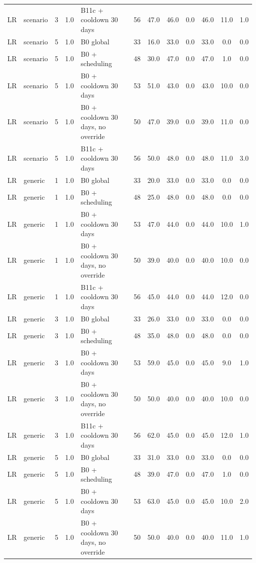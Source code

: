 \documentclass[10pt,onecolumn,letterpaper]{article}
\begin{document}
\begin{longtable}{lllllccccccc}
LR & scenario & 3 & 1.0 & B11c + cooldown 30 days & 56 & 47.0 & 46.0 & 0.0 & 46.0 & 11.0 & 1.0 \\
LR & scenario & 5 & 1.0 & B0 global & 33 & 16.0 & 33.0 & 0.0 & 33.0 & 0.0 & 0.0 \\
LR & scenario & 5 & 1.0 & B0 + scheduling & 48 & 30.0 & 47.0 & 0.0 & 47.0 & 1.0 & 0.0 \\
LR & scenario & 5 & 1.0 & B0 + cooldown 30 days & 53 & 51.0 & 43.0 & 0.0 & 43.0 & 10.0 & 0.0 \\
LR & scenario & 5 & 1.0 & B0 + cooldown 30 days, no override & 50 & 47.0 & 39.0 & 0.0 & 39.0 & 11.0 & 0.0 \\
LR & scenario & 5 & 1.0 & B11c + cooldown 30 days & 56 & 50.0 & 48.0 & 0.0 & 48.0 & 11.0 & 3.0 \\
LR & generic & 1 & 1.0 & B0 global & 33 & 20.0 & 33.0 & 0.0 & 33.0 & 0.0 & 0.0 \\
LR & generic & 1 & 1.0 & B0 + scheduling & 48 & 25.0 & 48.0 & 0.0 & 48.0 & 0.0 & 0.0 \\
LR & generic & 1 & 1.0 & B0 + cooldown 30 days & 53 & 47.0 & 44.0 & 0.0 & 44.0 & 10.0 & 1.0 \\
LR & generic & 1 & 1.0 & B0 + cooldown 30 days, no override & 50 & 39.0 & 40.0 & 0.0 & 40.0 & 10.0 & 0.0 \\
LR & generic & 1 & 1.0 & B11c + cooldown 30 days & 56 & 45.0 & 44.0 & 0.0 & 44.0 & 12.0 & 0.0 \\
LR & generic & 3 & 1.0 & B0 global & 33 & 26.0 & 33.0 & 0.0 & 33.0 & 0.0 & 0.0 \\
LR & generic & 3 & 1.0 & B0 + scheduling & 48 & 35.0 & 48.0 & 0.0 & 48.0 & 0.0 & 0.0 \\
LR & generic & 3 & 1.0 & B0 + cooldown 30 days & 53 & 59.0 & 45.0 & 0.0 & 45.0 & 9.0 & 1.0 \\
LR & generic & 3 & 1.0 & B0 + cooldown 30 days, no override & 50 & 50.0 & 40.0 & 0.0 & 40.0 & 10.0 & 0.0 \\
LR & generic & 3 & 1.0 & B11c + cooldown 30 days & 56 & 62.0 & 45.0 & 0.0 & 45.0 & 12.0 & 1.0 \\
LR & generic & 5 & 1.0 & B0 global & 33 & 31.0 & 33.0 & 0.0 & 33.0 & 0.0 & 0.0 \\
LR & generic & 5 & 1.0 & B0 + scheduling & 48 & 39.0 & 47.0 & 0.0 & 47.0 & 1.0 & 0.0 \\
LR & generic & 5 & 1.0 & B0 + cooldown 30 days & 53 & 63.0 & 45.0 & 0.0 & 45.0 & 10.0 & 2.0 \\
LR & generic & 5 & 1.0 & B0 + cooldown 30 days, no override & 50 & 50.0 & 40.0 & 0.0 & 40.0 & 11.0 & 1.0 \\

\end{longtable}
\end{document}
